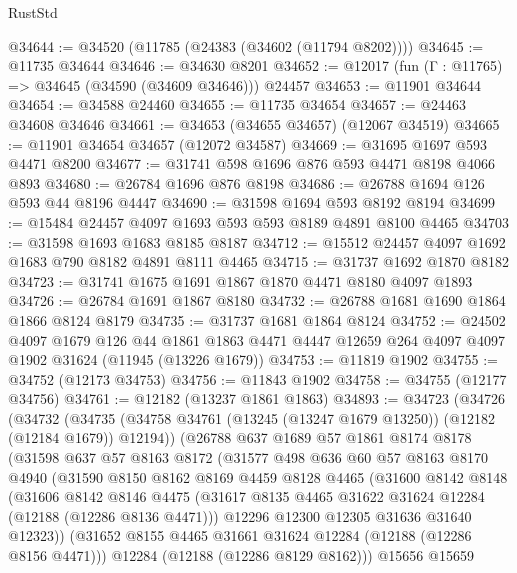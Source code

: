 \begin{lexlean}{RustStd}
\begin{coremodule}
@34644 := @34520 (@11785 (@24383 (@34602 (@11794 @8202))))
@34645 := @11735 @34644
@34646 := @34630 @8201
@34652 := @12017 (fun (Γ : @11765) => @34645 (@34590 (@34609 @34646))) @24457
@34653 := @11901 @34644
@34654 := @34588 @24460
@34655 := @11735 @34654
@34657 := @24463 @34608 @34646
@34661 := @34653 (@34655 @34657) (@12067 @34519)
@34665 := @11901 @34654 @34657 (@12072 @34587)
@34669 := @31695 @1697 @593 @4471 @8200
@34677 := @31741 @598 @1696 @876 @593 @4471 @8198 @4066 @893
@34680 := @26784 @1696 @876 @8198
@34686 := @26788 @1694 @126 @593 @44 @8196 @4447
@34690 := @31598 @1694 @593 @8192 @8194
@34699 := @15484 @24457 @4097 @1693 @593 @593 @8189 @4891 @8100 @4465
@34703 := @31598 @1693 @1683 @8185 @8187
@34712 := @15512 @24457 @4097 @1692 @1683 @790 @8182 @4891 @8111 @4465
@34715 := @31737 @1692 @1870 @8182
@34723 := @31741 @1675 @1691 @1867 @1870 @4471 @8180 @4097 @1893
@34726 := @26784 @1691 @1867 @8180
@34732 := @26788 @1681 @1690 @1864 @1866 @8124 @8179
@34735 := @31737 @1681 @1864 @8124
@34752 := @24502
    @4097
    @1679
    @126
    @44
    @1861
    @1863
    @4471
    @4447
    @12659
    @264
    @4097
    @4097
    @1902
    @31624
    (@11945 (@13226 @1679))
@34753 := @11819 @1902
@34755 := @34752 (@12173 @34753)
@34756 := @11843 @1902
@34758 := @34755 (@12177 @34756)
@34761 := @12182 (@13237 @1861 @1863)
@34893 := @34723
    (@34726
      (@34732
        (@34735 (@34758 @34761 (@13245 (@13247 @1679 @13250)) (@12182 (@12184 @1679)) @12194))
        (@26788
          @637
          @1689
          @57
          @1861
          @8174
          @8178
          (@31598
            @637
            @57
            @8163
            @8172
            (@31577
              @498
              @636
              @60
              @57
              @8163
              @8170
              @4940
              (@31590
                @8150
                @8162
                @8169
                @4459
                @8128
                @4465
                (@31600
                  @8142
                  @8148
                  (@31606
                    @8142
                    @8146
                    @4475
                    (@31617 @8135 @4465 @31622 @31624 @12284 (@12188 (@12286 @8136 @4471)))
                    @12296
                    @12300
                    @12305
                    @31636
                    @31640
                    @12323))
                (@31652 @8155 @4465 @31661 @31624 @12284 (@12188 (@12286 @8156 @4471)))
                @12284
                (@12188 (@12286 @8129 @8162)))
              @15656
              @15659

\end{coremodule}
\end{lexlean}
